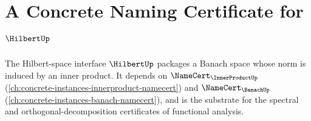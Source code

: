 \chapter{A Concrete Naming Certificate for $\HilbertUp$}
\label{ch:concrete-instances-hilbert-namecert}

The Hilbert-space interface $\HilbertUp$ packages a Banach space whose norm is induced by an inner product. It depends on $\NameCert_{\InnerProductUp}$ (\autoref{ch:concrete-instances-innerproduct-namecert}) and $\NameCert_{\BanachUp}$ (\autoref{ch:concrete-instances-banach-namecert}), and is the substrate for the spectral and orthogonal-decomposition certificates of functional analysis.









